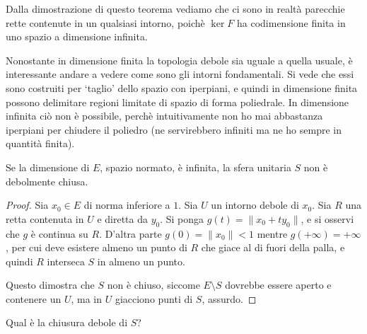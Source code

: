 \begin{remark}
	Dalla dimostrazione di questo teorema vediamo che ci sono in realtà parecchie rette contenute in un qualsiasi intorno, poichè $\ker F$ ha codimensione finita in uno spazio a dimensione infinita.
\end{remark}

Nonostante in dimensione finita la topologia debole sia uguale a quella usuale, è interessante andare a vedere come sono gli intorni fondamentali. Si vede che essi sono costruiti per `taglio' dello spazio con iperpiani, e quindi in dimensione finita possono delimitare regioni limitate di spazio di forma poliedrale. In dimensione infinita ciò non è possibile, perchè intuitivamente non ho mai abbastanza iperpiani per chiudere il poliedro (ne servirebbero infiniti ma ne ho sempre in quantità finita).

\begin{corollary}
	Se la dimensione di $E$, spazio normato, è infinita, la sfera unitaria $S$ non è debolmente chiusa.
\end{corollary}
\begin{proof}
	Sia $x_0 \in E$ di norma inferiore a $1$. Sia $U$ un intorno debole di $x_0$. Sia $R$ una retta contenuta in $U$ e diretta da $y_0$. Si ponga $g(t) = \|x_0 + ty_0\|$, e si osservi che $g$ è continua su $R$. D'altra parte $g(0) = \|x_0\| < 1$ mentre $g(+\infty) = + \infty$, per cui deve esistere almeno un punto di $R$ che giace al di fuori della palla, e quindi $R$ interseca $S$ in almeno un punto.

	Questo dimostra che $S$ non è chiuso, siccome $E \setminus S$ dovrebbe essere aperto e contenere un $U$, ma in $U$ giacciono punti di $S$, assurdo.
\end{proof}

\begin{exercise}
	Qual è la chiusura debole di $S$?
\end{exercise}

